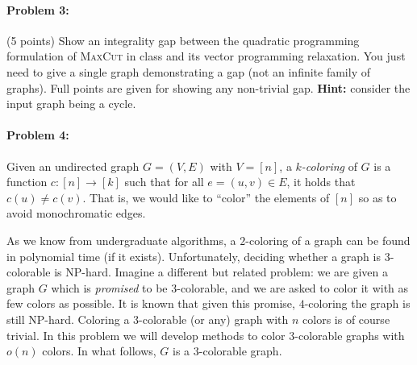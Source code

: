 \documentclass[12pt]{article}
\begin{document}
\paragraph{Problem 3:} (5 points) Show an integrality gap between the quadratic programming formulation of \textsc{MaxCut} in class and its vector programming relaxation. You just need to give a single graph demonstrating a gap (not an infinite family of graphs). Full points are given for showing any non-trivial gap. \textbf{Hint:} consider the input graph being a cycle.

\paragraph{Problem 4:} Given an undirected graph $G = (V,E)$ with $V = [n]$, a {\em $k$-coloring} of $G$ is a function $c:[n]\rightarrow[k]$ such that for all $e = (u,v)\in E$, it holds that $c(u) \neq c(v)$. That is, we would like to ``color'' the elements of $[n]$ so as to avoid monochromatic edges.

As we know from undergraduate algorithms, a $2$-coloring of a graph can be found in polynomial time (if it exists). Unfortunately, deciding whether a graph is $3$-colorable is NP-hard. Imagine a different but related problem: we are given a graph $G$ which is {\em promised} to be $3$-colorable, and we are asked to color it with as few colors as possible. It is known that given this promise, $4$-coloring the graph is still NP-hard. Coloring a $3$-colorable (or any) graph with $n$ colors is of course trivial. In this problem we will develop methods to color $3$-colorable graphs with $o(n)$ colors. In what follows, $G$ is a $3$-colorable graph.
\end{document}
